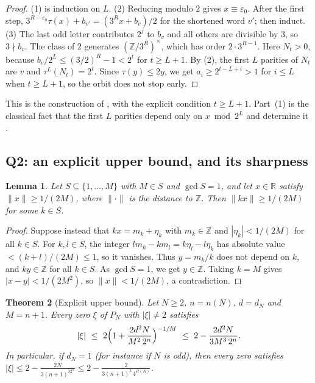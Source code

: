 \documentclass[11pt,a4paper]{article}
\newtheorem{theorem}{Theorem}[section]
\newtheorem{lemma}[theorem]{Lemma}
\theoremstyle{definition}
\theoremstyle{remark}
\numberwithin{equation}{section}
\begin{document}
\begin{proof}
(1) is induction on $L$.  (2) Reducing modulo $2$ gives $x\equiv\varepsilon_0$.
After the first step, $3^{R-\varepsilon_0}\tau(x)+b_{v'}=(3^Rx+b_v)/2$ for the
shortened word $v'$; then induct.  (3) The last odd letter contributes $2^j$ to
$b_v$ and all others are divisible by $3$, so $3\nmid b_v$.  The class of $2$
generates $(\mathbb Z/3^R)^\times$, which has order $2\cdot3^{R-1}$.  Here $N_t>0$, because $b_v/2^L\le(3/2)^R-1<2^t$ for $t\ge L+1$.  By (2),
the first $L$ parities of $N_t$ are $v$ and $\tau^L(N_t)=2^t$.  Since $\tau(y)\le2y$, we get
$a_i\ge2^{t-L+i}>1$ for $i\le L$ when $t\ge L+1$, so the orbit does not stop
early.
\end{proof}

This is the construction of \cite[Section~3.1]{R021}, with the explicit
condition $t\ge L+1$.  Part~(1) is the classical fact that the first $L$
parities depend only on $x\bmod2^L$ and determine it \cite{R029,R030}.

\subsection{Q2: an explicit upper bound, and its sharpness}\label{B:C:ssec-Q2}

\begin{lemma}\label{B:C:lem-dioph}
Let $S\subseteq\{1,\dots,M\}$ with $M\in S$ and $\gcd S=1$, and let $x\in\mathbb R$
satisfy $\|x\|\ge1/(2M)$, where $\|\cdot\|$ is the distance to $\mathbb Z$.  Then
$\|kx\|\ge1/(2M)$ for some $k\in S$.
\end{lemma}

\begin{proof}
Suppose instead that $kx=m_k+\eta_k$ with $m_k\in\mathbb Z$ and $|\eta_k|<1/(2M)$
for all $k\in S$.  For $k,l\in S$, the integer $lm_k-km_l=k\eta_l-l\eta_k$ has
absolute value $<(k+l)/(2M)\le1$, so it vanishes.  Thus $y=m_k/k$ does not
depend on $k$, and $ky\in\mathbb Z$ for all $k\in S$.  As $\gcd S=1$, we get
$y\in\mathbb Z$.  Taking $k=M$ gives $|x-y|<1/(2M^2)$, so $\|x\|<1/(2M)$, a
contradiction.
\end{proof}

\begin{theorem}[Explicit upper bound]\label{B:C:thm-upper}
Let $N\ge2$, $n=n(N)$, $d=d_N$ and $M=n+1$.  Every zero $\xi$ of $P_N$ with
$|\xi|\ne2$ satisfies
\begin{equation}\label{B:C:eq-upper}
|\xi|\ \le\ 2\Bigl(1+\frac{2d^2N}{M^2\,2^n}\Bigr)^{-1/M}
\ \le\ 2-\frac{2d^2N}{3M^3\,2^n}.
\end{equation}
In particular, if $d_N=1$ (for instance if $N$ is odd), then every zero satisfies
$|\xi|\le2-\frac{2N}{3(n+1)^32^n}\le2-\frac{2}{3(n+1)^3\,4^{R(N)}}$.
\end{theorem}
\end{document}
